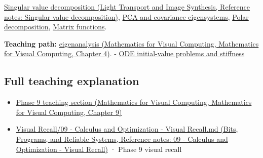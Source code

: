 \href{../04-Light-Transport-and-Image-Synthesis/main.pdf\#nameddest=appendix-1fad5e7f36fa}{Singular value decomposition (Light Transport and Image Synthesis, Reference notes: Singular value decomposition)}, \hyperref[appendix-ad175ef3c5bf]{PCA and covariance eigensystems}, \hyperref[appendix-73f5bcf7a462]{Polar decomposition}, \hyperref[appendix-0f4bc2bf2b1f]{Matrix functions}.

\textbf{Teaching path:} \href{../02-Mathematics-for-Visual-Computing/main.pdf\#nameddest=01-foundations-i-ch020-eigenvectors-reveal-the-directions-a-square-map-does-not-turn}{eigenanalysis (Mathematics for Visual Computing, Mathematics for Visual Computing, Chapter 4)}. - \hyperref[appendix-e8ab9836882e]{ODE initial-value problems and stiffness}

\subsection{Full teaching explanation}\label{appendix-0b3be18411f9-full-teaching-explanation}

\begin{itemize}
\tightlist
\item
  \href{../02-Mathematics-for-Visual-Computing/main.pdf\#nameddest=02-foundations-ii-ch025-odes-and-numerical-simulation}{Phase 9 teaching section (Mathematics for Visual Computing, Mathematics for Visual Computing, Chapter 9)}
\item
  \href{../01-Bits-Programs-and-Reliable-Systems/main.pdf\#nameddest=appendix-adf48f5dc5c1}{Visual Recall/09 - Calculus and Optimization - Visual Recall.md (Bits, Programs, and Reliable Systems, Reference notes: 09 - Calculus and Optimization - Visual Recall)} · Phase 9 visual recall
\end{itemize}
